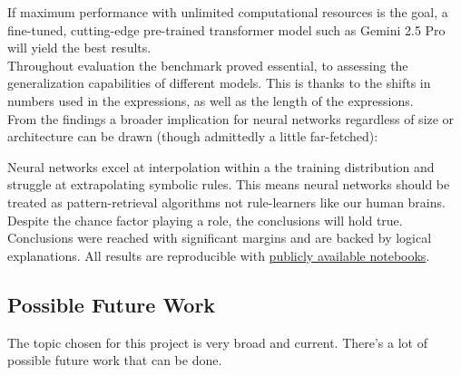 \documentclass{article}
\begin{document}
If maximum performance with unlimited computational resources is the goal, a fine-tuned, cutting-edge pre-trained transformer model such as Gemini 2.5 Pro will yield the best results.
\\[0.5em]
Throughout evaluation the benchmark proved essential, to assessing the generalization capabilities of different models. This is thanks to the shifts in numbers used in the expressions, as well as the length of the expressions.
\\[0.5em]
From the findings a broader implication for neural networks regardless of size or architecture can be drawn (though admittedly a little far-fetched): 

Neural networks excel at interpolation within a the training distribution and struggle at extrapolating symbolic rules. This means neural networks should be treated as pattern-retrieval algorithms not rule-learners like our human brains.
\\[0.5em]
Despite the chance factor playing a role, the conclusions will hold true. Conclusions were reached with significant margins and are backed by logical explanations. All results are reproducible with \href{https://github.com/AntonStantan/matura/tree/main}{publicly available notebooks}.

\subsection{Possible Future Work}
The topic chosen for this project is very broad and current. There's a lot of possible future work that can be done.
\end{document}
